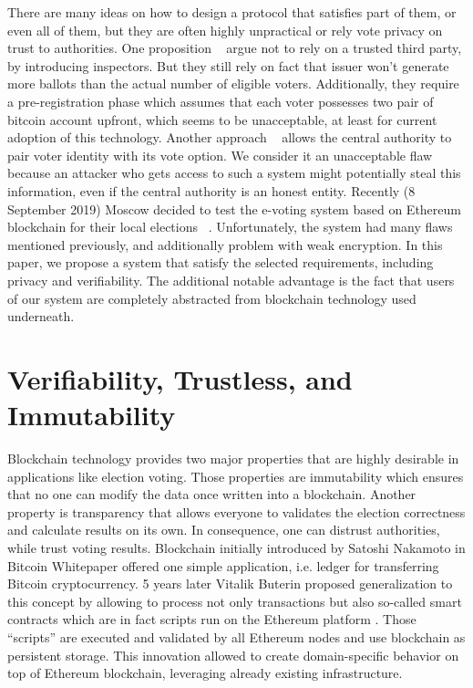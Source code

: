 \documentclass[runningheads]{llncs}
\begin{document}
There are many ideas on how to design a protocol that satisfies part of them, or even all of them, but they are often highly unpractical or rely vote privacy on trust to authorities. One proposition ~\cite{liu2017voting} argue not to rely on a trusted third party, by introducing inspectors. But they still rely on fact that issuer won't generate more ballots than the actual number of eligible voters. Additionally, they require a pre-registration phase which assumes that each voter possesses two pair of bitcoin account upfront, which seems to be unacceptable, at least for current adoption of this technology. Another approach ~\cite{hardwick2018voting} allows the central authority to pair voter identity with its vote option. We consider it an unacceptable flaw because an attacker who gets access to such a system might potentially steal this information, even if the central authority is an honest entity. Recently (8 September 2019) Moscow decided to test the e-voting system based on Ethereum blockchain for their local elections ~\cite{gaudry2019breaking}. Unfortunately, the system had many flaws mentioned previously, and additionally problem with weak encryption.  
In this paper, we propose a system that satisfy  the selected requirements, including privacy and verifiability. 
The additional notable advantage is the fact that users of our system are completely abstracted from blockchain technology used underneath.



\section{Verifiability, Trustless, and Immutability}
Blockchain technology provides two major properties that are highly desirable in applications like election voting. Those properties are immutability which ensures that no one can modify the data once written into a blockchain. 
Another property is transparency that allows everyone to validates the election correctness and calculate results on its own. In consequence, one can distrust authorities, while trust voting results. 
Blockchain initially introduced by Satoshi Nakamoto in Bitcoin Whitepaper \cite{nakamoto2008bitcoin} 
offered one simple application, i.e. ledger for transferring Bitcoin cryptocurrency. 5 years later Vitalik Buterin proposed generalization to this concept by allowing to process not only transactions but also so-called smart contracts which are in fact scripts run on the Ethereum platform \cite{buterin2013ethereum}. Those “scripts” are executed and validated by all Ethereum nodes and use blockchain as persistent storage. This innovation allowed to create domain-specific behavior on top of Ethereum blockchain, leveraging already existing infrastructure.
\end{document}
